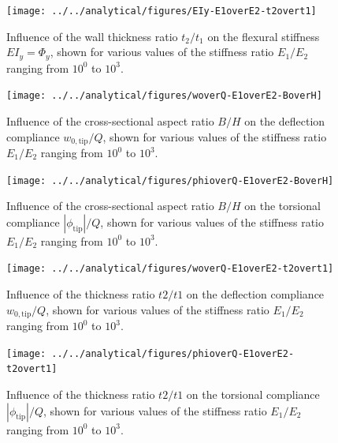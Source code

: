     \begin{figure}[!htpb] %
      \centering
      \texttt{[image: ../../analytical/figures/EIy-E1overE2-t2overt1]}
      \caption[Influence of the wall thickness ratio $t_2/t_1$ on the flexural stiffness $EI_y$]{Influence of the wall thickness ratio $t_2/t_1$ on the flexural stiffness $EI_y = \Phi_y$, shown for various values of the stiffness ratio $E_1/E_2$ ranging from $10^0$ to $10^3$. }\label{fig:EIy-E1overE2-t2overt1}
    \end{figure}

    \begin{figure}[!htpb] %
      \centering
      \texttt{[image: ../../analytical/figures/woverQ-E1overE2-BoverH]}
      \caption[Influence of the cross-sectional aspect ratio $B/H$ on the deflection compliance]{Influence of the cross-sectional aspect ratio $B/H$ on the deflection compliance $w_{\mathrm{0,tip}} / Q$, shown for various values of the stiffness ratio $E_1/E_2$ ranging from $10^0$ to $10^3$. }\label{fig:woverQ-E1overE2-BoverH}
    \end{figure}

    \begin{figure}[!htpb] %
      \centering
      \texttt{[image: ../../analytical/figures/phioverQ-E1overE2-BoverH]}
      \caption[Influence of the cross-sectional aspect ratio $B/H$ on the torsional compliance]{Influence of the cross-sectional aspect ratio $B/H$ on the torsional compliance $|\phi_{\mathrm{tip}}| / Q$, shown for various values of the stiffness ratio $E_1/E_2$ ranging from $10^0$ to $10^3$. }\label{fig:phioverQ-E1overE2-BoverH}
    \end{figure}

    \begin{figure}[!htpb] %
      \centering
      \texttt{[image: ../../analytical/figures/woverQ-E1overE2-t2overt1]}
      \caption[Influence of the thickness ratio $t2/t1$ on the deflection compliance]{Influence of the thickness ratio $t2/t1$ on the deflection compliance $w_{\mathrm{0,tip}} / Q$, shown for various values of the stiffness ratio $E_1/E_2$ ranging from $10^0$ to $10^3$. }\label{fig:woverQ-E1overE2-t2overt1}
    \end{figure}

    \begin{figure}[!htpb] %
      \centering
      \texttt{[image: ../../analytical/figures/phioverQ-E1overE2-t2overt1]}
      \caption[Influence of the thickness ratio $t2/t1$ on the torsional compliance]{Influence of the thickness ratio $t2/t1$ on the torsional compliance $|\phi_{\mathrm{tip}}| / Q$, shown for various values of the stiffness ratio $E_1/E_2$ ranging from $10^0$ to $10^3$. }\label{fig:phioverQ-E1overE2-t2overt1}
    \end{figure}


